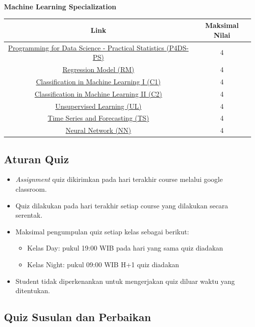 \documentclass[
]{book}
\providecommand{\tightlist}{%
  \setlength{\itemsep}{0pt}\setlength{\parskip}{0pt}}
\begin{document}
\textbf{Machine Learning Specialization}

\begin{longtable}[]{@{}cc@{}}
\toprule
\textbf{Link} & \textbf{Maksimal Nilai}\tabularnewline
\midrule
\endhead
\href{https://corgi.re/courses/Davidlimbong/P4DS-PS}{Programming for Data Science - Practical Statistics (P4DS-PS)} & 4\tabularnewline
\href{https://corgi.re/courses/ahmadhusain/regressionmodels}{Regression Model (RM)} & 4\tabularnewline
\href{https://corgi.re/courses/inytss/classification1}{Classification in Machine Learning I (C1)} & 4\tabularnewline
\href{https://corgi.re/courses/ysitta/Classification2}{Classification in Machine Learning II (C2)} & 4\tabularnewline
\href{https://corgi.re/courses/Davidlimbong/UnsupervisedLearning}{Unsupervised Learning (UL)} & 4\tabularnewline
\href{https://corgi.re/courses/inytss/time-series}{Time Series and Forecasting (TS)} & 4\tabularnewline
\href{https://corgi.re/courses/ysitta/Neural_Network}{Neural Network (NN)} & 4\tabularnewline
\bottomrule
\end{longtable}

\hypertarget{aturan-quiz}{%
\subsection{Aturan Quiz}\label{aturan-quiz}}

\begin{itemize}
\item
  \emph{Assignment} quiz dikirimkan pada hari terakhir course melalui google classroom.
\item
  Quiz dilakukan pada hari terakhir setiap course yang dilakukan secara serentak.
\item
  Maksimal pengumpulan quiz setiap kelas sebagai berikut:

  \begin{itemize}
  \tightlist
  \item
    Kelas Day: pukul 19:00 WIB pada hari yang sama quiz diadakan
  \item
    Kelas Night: pukul 09:00 WIB H+1 quiz diadakan
  \end{itemize}
\item
  Student tidak diperkenankan untuk mengerjakan quiz diluar waktu yang ditentukan.
\end{itemize}

\hypertarget{quiz-susulan-dan-perbaikan}{%
\subsection{Quiz Susulan dan Perbaikan}\label{quiz-susulan-dan-perbaikan}}
\end{document}
